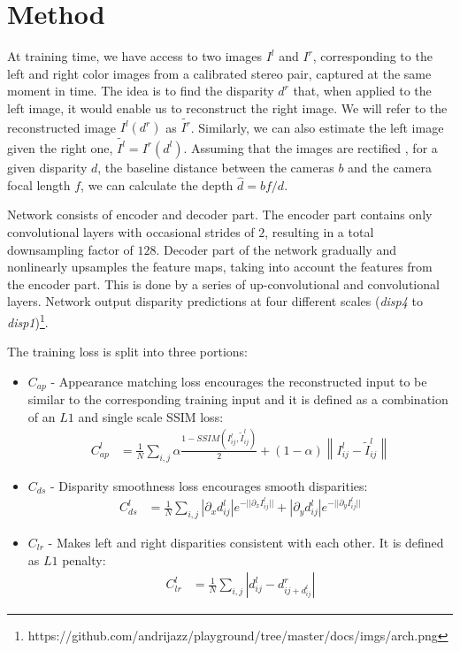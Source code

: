 \documentclass{article}
\begin{document}
\section{Method}
At training time, we have access to two images $I^l$ and $I^r$, corresponding to the left and right color images from a calibrated stereo pair, captured at the same moment in time. The idea is to find the disparity $d^r$ that, when applied to the left image, it would enable us to reconstruct the right image. We will refer to the reconstructed image $I^l(d^r)$ as $\tilde{I^r}$. Similarly, we can also estimate the left image given the right one, $\tilde{I^l} = I^r(d^l)$. Assuming that the images are rectified \cite{Hartley:2003:MVG:861369}, for a given disparity $d$, the baseline distance between the cameras $b$ and the camera focal length $f$, we can calculate the depth $\hat{d}=bf/d$.

Network consists of encoder and decoder part. The encoder part contains only convolutional layers with occasional strides of $2$, resulting in a total downsampling factor of $128$. Decoder part of the network gradually and nonlinearly upsamples the feature maps, taking into account the features from the encoder part. This is done by a series of up-convolutional and convolutional layers. Network output disparity predictions at four different scales (\emph{disp4} to \emph{disp1})\footnote{https://github.com/andrijazz/playground/tree/master/docs/imgs/arch.png}.

The training loss is split into three portions:
\begin{itemize}
	\item $C_{ap}$ - Appearance matching loss encourages the reconstructed input to be similar to the corresponding training input and it is defined as a combination of an $L1$ and single scale SSIM loss:
	\begin{align*}
		C_{ap}^l &= \frac{1}{N}\sum_{i,j}\alpha \frac{1 - SSIM(I_{ij}^l, \tilde{I}_{ij}^l)}{2} + (1 - \alpha)  \left\lVert I_{ij}^l - \tilde{I}_{ij}^l \right\rVert
	\end{align*}
	
	\item $C_{ds}$ - Disparity smoothness loss encourages smooth disparities:
	\begin{align*}
		C_{ds}^l &= \frac{1}{N}\sum_{i,j}|\partial_x d_{ij}^l|e^{-|| \partial_x I_{ij}^l ||} + |\partial_y d_{ij}^l|e^{-|| \partial_y I_{ij}^l ||}
	\end{align*}
	
	\item $C_{lr}$ - Makes left and right disparities consistent with each other. It is defined as $L1$ penalty: 
	\begin{align*}
		C_{lr}^l &= \frac{1}{N}\sum_{i,j}|d_{ij}^l - d_{ij + d_{ij}^l}^r|
	\end{align*}	
\end{itemize}
\end{document}
